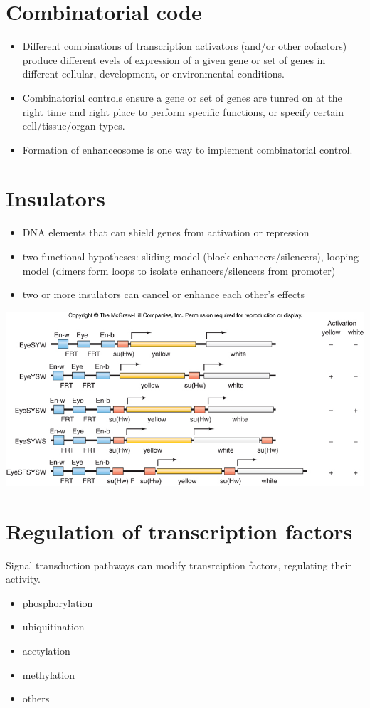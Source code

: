 \documentclass[10pt]{article}
\newenvironment{mitemize}
{
  \begin{itemize}
  \setlength{\itemsep}{1pt}
  \setlength{\parskip}{0pt}
  \setlength{\parsep}{0pt}}{\end{itemize}
}
\begin{document}
\section*{Combinatorial code}
\begin{mitemize}
  \item Different combinations of transcription activators (and/or other cofactors) produce different evels of expression of a given gene or set of genes in different cellular, development, or environmental conditions.
  \item Combinatorial controls ensure a gene or set of genes are tunred on at the right time and right place to perform specific functions, or specify certain cell/tissue/organ types.
  \item Formation of enhanceosome is one way to implement combinatorial control.
\end{mitemize}

\section*{Insulators}
\begin{mitemize}
  \item DNA elements that can shield genes from activation or repression
  \item two functional hypotheses: sliding model (block enhancers/silencers), looping model (dimers form loops to isolate enhancers/silencers from promoter)
  \item two or more insulators can cancel or enhance each other's effects
\end{mitemize}
\vspace{25px}

\begin{center}
  \includegraphics{insulators.jpg}
\end{center}

\section*{Regulation of transcription factors}
Signal transduction pathways can modify transrciption factors, regulating their activity.
\begin{mitemize}
  \item phosphorylation
  \item ubiquitination
  \item acetylation
  \item methylation
  \item others
\end{mitemize}
\end{document}
